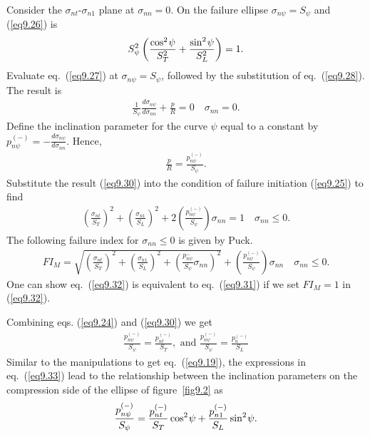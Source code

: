 \documentclass{AeroStructure-ERJohnson}
\begin{document}
Consider the $\sigma_\textit{nt}$-$\sigma_{n1}$ plane at $\sigma_\textit{nn}=0$. On the failure ellipse $\sigma_{n\psi}=S_{\psi}$ and (\ref{eq9.26}) is
\begin{align}\label{eq9.28}
S_{\psi}^{2}\left(\frac{\cos ^{2}{\kern-1pt\psi}}{S_{T}^{2}}+\frac{\sin ^{2}{\kern-1pt\psi}}{S_{L}^{2}}\right)=1.
\end{align}
Evaluate eq.~(\ref{eq9.27}) at $\sigma_{n \psi}=S_{\psi}$, followed by the substitution of eq.~(\ref{eq9.28}). The result is
\begin{align}\label{eq9.29}
\frac{1}{S_{\psi}} \frac{d \sigma_{n \psi}}{d \sigma_{n n}}+\frac{p}{R}=0 \quad \sigma_{n n}=0.
\end{align}
Define the inclination parameter for the curve $\psi$ equal to a constant by $p_{n\psi}^{(-)}=-\frac{d \sigma_{n \psi}}{d \sigma_{n n}}$. Hence,
\begin{align}\label{eq9.30}
\frac{p}{R}=\frac{p_{n \psi}^{(-)}}{S_{\psi}}.
\end{align}
Substitute the result (\ref{eq9.30}) into the condition of failure initiation (\ref{eq9.25}) to find
\begin{align}\label{eq9.31}
\left(\frac{\sigma_{n t}}{S_{T}}\right)^{2}+\left(\frac{\sigma_{n 1}}{S_{L}}\right)^{2}+2\left(\frac{p_{n \psi}^{(-)}}{S_{\psi}}\right) \sigma_{n n}=1 \quad \sigma_{n n} \leq 0.
\end{align}
The following failure index for $\sigma_{n n} \leq 0$ is given by Puck.
\begin{align}\label{eq9.32}
F I_{M}=\sqrt{\left(\frac{\sigma_{n t}}{S_{T}}\right)^{2}+\left(\frac{\sigma_{n 1}}{S_{L}}\right)^{2}+\left(\frac{p_{n \psi}^{-}}{S_{\psi}} \sigma_{n n}\right)^{2}}+\left(\frac{p_{n \psi}^{(-)}}{S_{\psi}}\right) \sigma_{n n} \quad \sigma_{n n} \leq 0.
\end{align}
One can show eq.~(\ref{eq9.32}) is equivalent to eq.~(\ref{eq9.31}) if we set $F I_{M}=1$ in (\ref{eq9.32}).

Combining eqs. (\ref{eq9.24}) and (\ref{eq9.30}) we get
\begin{align}\label{eq9.33}
\frac{p_{n \psi}^{(-)}}{S_{\psi}}=\frac{p_{n t}^{(-)}}{S_{T}}, \textrm{ and } \frac{p_{n \psi}^{(-)}}{S_{\psi}}=\frac{p_{n}^{(-)}}{S_{L}}
\end{align}
Similar to the manipulations to get eq.~(\ref{eq9.19}), the expressions in eq.~(\ref{eq9.33}) lead to the relationship between the inclination parameters on the compression side of the ellipse of figure~\ref{fig9.2} as
\begin{align}\label{eq9.34}
\frac{p_{n \psi}^{(-)}}{S_{\psi}}=\frac{p_{n t}^{(-)}}{S_{T}} \cos ^{2}{\kern-1pt\psi}+\frac{p_{n 1}^{(-)}}{S_{L}} \sin ^{2}{\kern-1pt\psi}.
\end{align}
\end{document}
